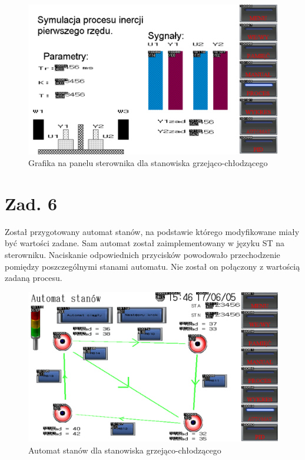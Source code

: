 \documentclass[a4paper,titlepage,11pt,twosides,floatssmall]{mwrep}
\begin{document}
\begin{figure}[]
	\centering
	\includegraphics[scale=0.6]{../graphics2.pdf}
	\caption{Grafika na panelu sterownika dla stanowiska grzejąco-chłodzącego}
	\label{zad5_graph}
\end{figure}


\chapter{Zad. 6}

Został przygotowany automat stanów, na podstawie którego modyfikowane miały być wartości zadane. Sam automat został zaimplementowany w języku ST na sterowniku. Naciskanie odpowiednich przycisków powodowało przechodzenie pomiędzy poszczególnymi stanami automatu. Nie został on połączony z wartością zadaną procesu.

\begin{figure}[]
	\centering
	\includegraphics[scale=0.6]{../graphics.pdf}
	\caption{Automat stanów dla stanowiska grzejąco-chłodzącego}
	\label{zad6_graph}
\end{figure}
\end{document}
